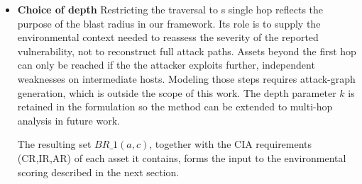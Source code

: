 \documentclass[conference]{IEEEtran}
\begin{document}
\begin{itemize}
        \textbf{Blast Radius} Generalizing to a traversal depth $k$, the blast radius of the vulnerability instance $(a,c)$ is
        \begin{equation}
            BR\_k(a,c) = \{v \in V_R:d_c(a,v) \leq k \}
        \end{equation}
        where $d_c(a,v)$ is the shortest-path distance from $a$ to $v$ to $G\_R$ along the direction selected by $m(c)$. The affected asset itself is included as $BR\_O(ac) = \{a\}$. In this work, we set $k = 1$, so the blast radius consists of the affected asset and its immediate neighbors under the reachability constraints of Eqs. (5)-(7). The procedure is given in Algorithm 1. It is a breadth-first search bounded at depth $k$ and restricted to edges in $E_R$. For $k = 1$, its cost is $O(deg(a))$, which allows blast radius identification to run on every incoming alert.
        \begin{algorithm}
        \caption{Blast Radius Identification}
        \label{alg:blast-radius}
        \begin{algorithmic}[1]
            \Require $G_{\mathrm{VKG}}$, alert $(a,c)$, depth $k$
            \Ensure $BR_k(a,c)$
        
            \State $m \gets \mathrm{ImpactMode}(\mathrm{CVSS}(c))$
            \State $BR \gets \{a\}$; \quad $frontier \gets \{a\}$
        
                \State $next \gets \emptyset$
                        \Statex {}
                            \State $BR \gets BR \cup \{v\}$
                            \State $next \gets next \cup \{v\}$
                        \EndIf
                    \EndFor
                \EndFor
                \State $frontier \gets next$
            \EndFor
        
            \State \Return $BR$
        \end{algorithmic}
        \end{algorithm}
        
        \item \textbf{Choice of depth} Restricting the traversal to s single hop reflects the purpose of the blast radius in our framework. Its role is to supply the environmental context needed to reassess the severity of the reported vulnerability, not to reconstruct full attack paths. Assets beyond the first hop can only be reached if the the attacker exploits further, independent weaknesses on intermediate hosts. Modeling those steps requires attack-graph generation, which is outside the scope of this work. The depth parameter $k$ is retained in the formulation so the method can be extended to multi-hop analysis in future work.
        
        The resulting set $BR\_1(a,c)$, together with the CIA requirements (CR,IR,AR) of each asset it contains, forms the input to the environmental scoring described in the next section.
    \end{itemize}
\end{document}
